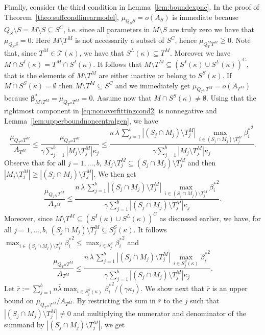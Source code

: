 \documentclass[bj,authoryear]{imsart}
\theoremstyle{plain}
\newcommand{\T}{\mathcal{T}}
\newcommand{\bs}{\boldsymbol}
\begin{document}
Finally, consider the third condition in Lemma~\ref{lem:boundexpnc}.
In the proof of Theorem~\ref{theo:suffcondlinearmodel}, $\mu_{Q_SS}=o(A_S)$ is immediate because $ Q_S \setminus S= M\setminus S\subseteq S^C$, i.e. since all parameters in $M \setminus S$ are truly zero we have that $\mu_{Q_SS}=0$.
Here $M\setminus T^M$ is not necessarily a subset of $S^C$, hence $\mu_{Q_T^M T^M} \geq 0$. Note that, since $T^M\in\T(\kappa)$, we have that $S^L(\kappa)\subseteq T^M$. Moreover we have $M\cap S^{I}(\kappa)=T^M\cap S^{I}(\kappa)$. It follows that $M\setminus T^M\subseteq (S^{I}(\kappa) \cup S^L(\kappa))^C$, that is the elements of $M\setminus T^M$ are either inactive or belong to $S^S(\kappa)$. If $M\cap S^{S}(\kappa)=\emptyset$ then $M\setminus T^M\subseteq S^C$ and we immediately get $\mu_{Q_{T^M} T^M}=o(A_{T^M})$ because $\bs\beta^*_{M \setminus T^M}=\mu_{Q_{T^M} T^M}=0$. Assume now that $M\cap S^{S}(\kappa)\neq\emptyset$. Using that the rightmost component in \eqref{eq:nonoverfittingcond2} is nonnegative and Lemma~\ref{lem:upperboundnoncentralgen}, we have
$$\frac{\mu_{Q_{T^M} T^M}}{ A_{T^M}} \leq \frac{\mu_{Q_{T^M} T^M}}{ \gamma\sum_{j=1}^b|M_j \setminus T^M_j|\kappa_j} \leq \frac{n\,\bar{\lambda}\,\sum_{j=1}^b|(S_j\cap M_j )\setminus T^M_j|\,\max_{i\in (S_j\cap M_j )\setminus T^M_j}{\beta_{i}^*}^2}{ \gamma\sum_{j=1}^b|M_j \setminus T^M_j|\kappa_j}.$$
Observe that for all $j=1,\ldots,b$, $M_j \setminus T^M_j \subseteq (S_j\cap M_j )\setminus T^M_j$ and then $|M_j \setminus T^M_j| \geq |(S_j\cap M_j )\setminus T^M_j|$. We then get
$$\frac{\mu_{Q_{T^M} T^M}}{ A_{T^M}} \leq \frac{n\,\bar{\lambda}\,\sum_{j=1}^b|(S_j\cap M_j )\setminus T^M_j|\,\max_{i\in(S_j\cap M_j )\setminus T^M_j}{\beta_{i}^*}^2}{ \gamma\sum_{j=1}^b|(S_j\cap M_j ) \setminus T^M_j|\kappa_j}.$$
Moreover, since  $M\setminus T^M\subseteq (S^{I}(\kappa) \cup S^L(\kappa))^C$ as discussed earlier, we have, for all $j=1,\ldots,b$, $(S_j\cap M_j )\setminus T^M_j \subseteq S^{S}_j(\kappa)$. It follows $\max_{i\in(S_j\cap M_j )\setminus T^M_j}{\beta_{i}^*}^2 \leq \max_{i\in S_j^S}{\beta_{i}^*}^2$ and
\begin{equation}\label{eq:onbfsa}
  \frac{\mu_{Q_{T^M} T^M}}{ A_{T^M}} \leq \frac{n\,\bar{\lambda}\,\sum_{j=1}^b|(S_j\cap M_j )\setminus T^M_j|\,\max_{i\in S^{S}_j(\kappa)}{\beta_{i}^*}^2}{ \gamma\sum_{j=1}^b|(S_j\cap M_j ) \setminus T^M_j|\kappa_j}.  
\end{equation}
Let $\bar{r}:=\sum_{j=1}^b n\bar{\lambda}\max_{i\in S^{S}_j(\kappa)}{\beta_i^*}^2/(\gamma\kappa_j)$. We show next that $\bar{r}$ is an upper bound on $\mu_{Q_{T^M} T^M}/ A_{T^M}$. By restricting the sum in $\bar{r}$ to the $j$ such that $|(S_j\cap M_j )\setminus T^M_j|\neq 0$ and multiplying the numerator and denominator of the summand by $|(S_j\cap M_j )\setminus T^M_j|$, we get 
\end{document}
